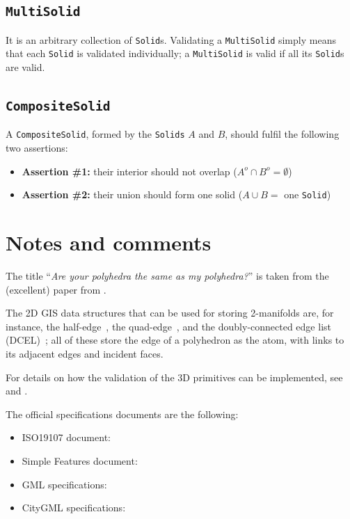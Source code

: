 \subsection{\texttt{MultiSolid}}
It is an arbitrary collection of \texttt{Solid}s.
Validating a \texttt{MultiSolid} simply means that each \texttt{Solid} is validated individually; a \texttt{MultiSolid} is valid if all its \texttt{Solid}s are valid.


\subsection{\texttt{CompositeSolid}}
A \texttt{CompositeSolid}, formed by the \texttt{Solids} $A$ and $B$, should fulfil the following two assertions:
\begin{itemize}
  \item \textbf{Assertion \#1:} their interior should not overlap ($A^{o} \cap B^{o} = \emptyset$)
  \item \textbf{Assertion \#2:} their union should form one solid ($A \cup B =$ one \texttt{Solid})
\end{itemize}


%
\section{Notes and comments}

The title ``\emph{Are your polyhedra the same as my polyhedra?}'' is taken from the (excellent) paper from \citet{Grunbaum03}.

The 2D GIS data structures that can be used for storing 2-manifolds are, for instance, the half-edge~\citep{Mantyla88}, the quad-edge~\citep{Guibas85}, and the doubly-connected edge list (DCEL)~\citep{Muller78}; all of these store the edge of a polyhedron as the atom, with links to its adjacent edges and incident faces.

For details on how the validation of the 3D primitives can be implemented, see \citet{13_cacaie} and \citet{18_ogdss_val3dity}.

The official specifications documents are the following:
\begin{itemize}
  \item ISO19107 document: \citet{ISO19107}
  \item Simple Features document: \citet{OGC-SF}
  \item GML specifications: \citet{OGC-GML}
  \item CityGML specifications: \citet{CityGML3.0CM}
\end{itemize}


